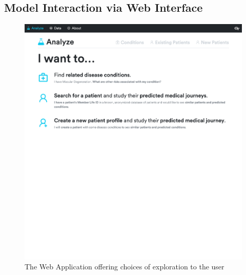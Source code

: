 \documentclass[twoside,11pt]{article}
\begin{document}
{\newpage
\subsection{Model Interaction via Web Interface} \label{appendix:websitescreenshots}

\begin{figure}[H]
  \includegraphics[width=\textwidth]{./images/website-screenshot-0.png}
  \caption{The Web Application offering choices of exploration to the user}
\end{figure}

}
\end{document}
